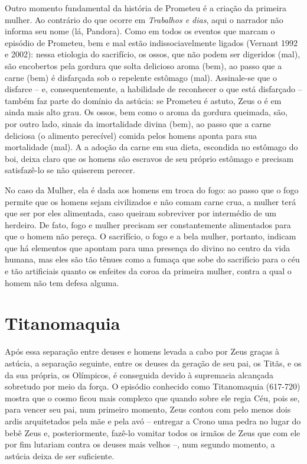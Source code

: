 Outro momento fundamental da história de Prometeu é a criação da
primeira mulher. Ao contrário do que ocorre em \emph{Trabalhos e dias},
aqui o narrador não informa seu nome (lá, Pandora). Como em todos os
eventos que marcam o episódio de Prometeu, bem e mal estão
indissociavelmente ligados (Vernant 1992 e 2002): nessa etiologia do
sacrifício, os ossos, que não podem ser digeridos (mal), são encobertos
pela gordura que solta delicioso aroma (bem), ao passo que a carne (bem)
é disfarçada sob o repelente estômago (mal). Assinale-se que o disfarce
-- e, consequentemente, a habilidade de reconhecer o que está disfarçado
-- também faz parte do domínio da astúcia: se Prometeu é astuto, Zeus o
é em ainda mais alto grau. Os ossos, bem como o aroma da gordura
queimada, são, por outro lado, sinais da imortalidade divina (bem), ao
passo que a carne deliciosa (o alimento perecível) comida pelos homens
aponta para sua mortalidade (mal). A a adoção da carne em sua dieta,
escondida no estômago do boi, deixa claro que os homens são escravos de
seu próprio estômago e precisam satisfazê-lo se não quiserem perecer.

No caso da Mulher, ela é dada aos homens em troca do fogo: ao passo que
o fogo permite que os homens sejam civilizados e não comam carne crua, a
mulher terá que ser por eles alimentada, caso queiram sobreviver por
intermédio de um herdeiro. De fato, fogo e mulher precisam ser
constantemente alimentados para que o homem não pereça. O sacrifício, o
fogo e a bela mulher, portanto, indicam que há elementos que apontam
para uma presença do divino no centro da vida humana, mas eles são tão
tênues como a fumaça que sobe do sacrifício para o céu e tão artificiais
quanto os enfeites da coroa da primeira mulher, contra a qual o homem
não tem defesa alguma.

\section{Titanomaquia}

Após essa separação entre deuses e homens levada a cabo por Zeus graças
à astúcia, a separação seguinte, entre os deuses da geração de seu pai,
os Titãs, e os da sua própria, os Olímpicos, é conseguida devido à
supremacia alcançada sobretudo por meio da força. O episódio conhecido
como Titanomaquia (617-720) mostra que o cosmo ficou mais complexo que
quando sobre ele regia Céu, pois se, para vencer seu pai, num primeiro
momento, Zeus contou com pelo menos dois ardis arquitetados pela mãe e
pela avó -- entregar a Crono uma pedra no lugar do bebê Zeus e,
posteriormente, fazê-lo vomitar todos os irmãos de Zeus que com ele por
fim lutariam contra os deuses mais velhos --, num segundo momento, a
astúcia deixa de ser suficiente.

